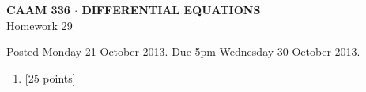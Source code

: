 \documentclass[10pt]{article}
\begin{document}
\vspace*{-5em}
\begin{center}
\large \textsf{\textbf{CAAM 336 $\cdot$ DIFFERENTIAL EQUATIONS}\\[0.5em]
Homework 29 }
\end{center}

Posted Monday 21 October 2013.  Due 5pm Wednesday 30 October 2013.

\begin{enumerate}\addtocounter{enumi}{28}
\item {[25 points]}  
\end{enumerate}
\end{document}
